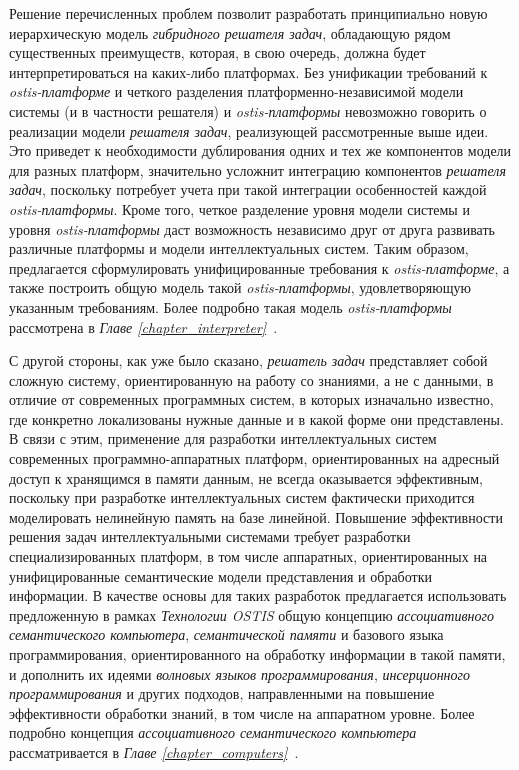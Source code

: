 Решение перечисленных проблем позволит разработать принципиально новую иерархическую модель \textit{гибридного решателя задач}, обладающую рядом существенных преимуществ, которая, в свою очередь, должна будет интерпретироваться на каких-либо платформах. Без унификации требований к \textit{ostis-платформе} и четкого разделения платформенно-независимой модели системы (и в частности решателя) и \textit{ostis-платформы} невозможно говорить о реализации модели \textit{решателя задач}, реализующей рассмотренные выше идеи. Это приведет к необходимости дублирования одних и тех же компонентов модели для разных платформ, значительно усложнит интеграцию компонентов \textit{решателя задач}, поскольку потребует учета при такой интеграции особенностей каждой \textit{ostis-платформы}. Кроме того, четкое разделение уровня модели системы и уровня \textit{ostis-платформы} даст возможность независимо друг от друга развивать различные платформы и модели интеллектуальных систем. Таким образом, предлагается сформулировать унифицированные требования к \textit{ostis-платформе}, а также построить общую модель такой \textit{ostis-платформы}, удовлетворяющую указанным требованиям. Более подробно такая модель \textit{ostis-платформы} рассмотрена в \textit{Главе \ref{chapter_interpreter}~}.

С другой стороны, как уже было сказано, \textit{решатель задач} представляет собой сложную систему, ориентированную на работу со знаниями, а не с данными, в отличие от современных программных систем, в которых изначально известно, где конкретно локализованы нужные данные и в какой форме они представлены. В связи с этим, применение для разработки интеллектуальных систем современных программно-аппаратных платформ, ориентированных на адресный доступ к хранящимся в памяти данным, не всегда оказывается эффективным, поскольку при разработке интеллектуальных систем фактически приходится моделировать нелинейную память на базе линейной. Повышение эффективности решения задач интеллектуальными системами требует разработки специализированных платформ, в том числе аппаратных, ориентированных на унифицированные семантические модели представления и обработки информации. В качестве основы для таких разработок предлагается использовать предложенную в рамках \textit{Технологии OSTIS} общую концепцию \textit{ассоциативного семантического компьютера}, \textit{семантической памяти} и базового языка программирования, ориентированного на обработку информации в такой памяти, и дополнить их идеями \textit{волновых языков программирования}, \textit{инсерционного программирования} и других подходов, направленными на повышение эффективности обработки знаний, в том числе на аппаратном уровне. Более подробно концепция \textit{ассоциативного семантического компьютера} рассматривается в \textit{Главе \ref{chapter_computers}~}. 

